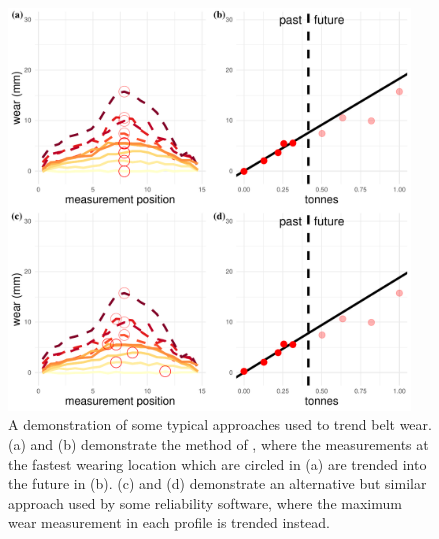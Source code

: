 \begin{figure}[tbp]
  \centering
  \includegraphics[width=0.95\textwidth]{figures/ch-6/current_approach.pdf}
  \caption{A demonstration of some typical approaches used to trend belt wear. (a) and (b) demonstrate the method of \citet{webb_2020}, where the measurements at the fastest wearing location which are circled in (a) are trended into the future in (b). (c) and (d) demonstrate an alternative but similar approach used by some reliability software, where the maximum wear measurement in each profile is trended instead.}
  \label{fig:linear-trend-demo}
\end{figure}

